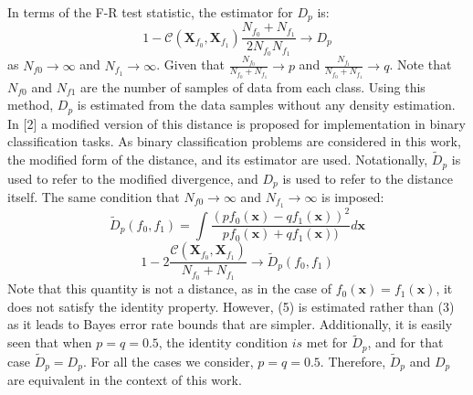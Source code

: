 \documentclass{article}
\begin{document}
	\indent In terms of the F-R test statistic, the estimator for $D_p$ is:
	\begin{equation}
	1 - \mathcal{C}(\textbf{X}_{f_0},\textbf{X}_{f_1})\frac{N_{f_0}+N_{f_1}}{2N_{f_0} N_{f_1}} \rightarrow D_p
	\end{equation}
	as $N_{f0} \rightarrow \infty$ and $N_{f_1} \rightarrow \infty$. Given that $\frac{N_{f_0}}{N_{f_0}+N_{f_1}} \rightarrow p$ and $\frac{N_{f_1}}{N_{f_0}+N_{f_1}} \rightarrow q$. Note that $N_{f0}$ and $N_{f1}$ are the number of samples of data from each class. Using this method, $D_p$ is estimated from the data samples without any density estimation. 
	\\	[0.5 ex]

	\indent In [2] a modified version of this distance is proposed for implementation in binary classification tasks. As binary classification problems are considered in this work, the modified form of the distance, and its estimator are used. Notationally, $\widetilde{D}_p$ is used to refer to the modified divergence, and $D_p$ is used to refer to the distance itself. The same condition that $N_{f0} \rightarrow \infty$ and $N_{f_1} \rightarrow \infty$ is imposed:
	\begin{equation}
		\widetilde{D}_p(f_0,f_1)=\int \frac{(p{f_0}(\textbf{x})-q{f_1}(\textbf{x}))^2}{p{f_0}(\textbf{x})+q{f_1}(\textbf{x}))}d\textbf{x}
	\end{equation}
	\begin{equation}
	1 - 2 \frac{\mathcal{C}(\textbf{X}_{f_0},\textbf{X}_{f_1})}{N_{f_0} + N_{f_1}} \rightarrow \widetilde{D}_p(f_0,f_1)
	\end{equation}
	Note that this quantity is not a distance, as in the case of $f_0(\textbf{x})=f_1(\textbf{x})$, it does not satisfy the identity property. However, (5) is estimated rather than (3) as it leads to Bayes error rate bounds that are simpler. Additionally, it is easily seen that when $p=q=0.5$, the identity condition $is$ met for $\widetilde{D}_p$, and for that case $\widetilde{D}_p=D_p$. For all the cases we consider, $p=q=0.5$. Therefore, $\widetilde{D}_p$ and $D_p$ are equivalent in the context of this work.
	
\end{document}
